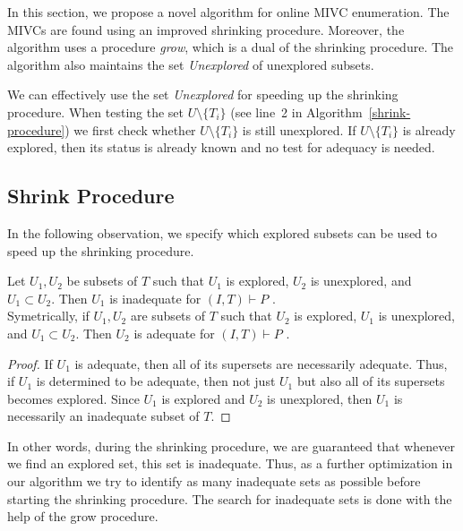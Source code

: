 In this section, we propose a novel algorithm for online MIVC enumeration. The MIVCs are found using an improved shrinking procedure. Moreover, the algorithm uses a procedure \emph{grow}, which is a dual of the shrinking procedure. The algorithm also maintains the set \emph{Unexplored} of unexplored subsets.

We can effectively use the set  \textit{Unexplored} for speeding up the shrinking procedure. When testing the set $U \setminus \{T_i\}$ (see line~2 in Algorithm~\ref{shrink-procedure}) we first check whether  $U \setminus \{T_i\}$ is still unexplored. If $U \setminus \{T_i\}$ is already explored, then its status is already known and no test for adequacy is needed.

\subsection{Shrink Procedure}
\label{sec:shrink}

\iffalse
We can effectively use the set  \textit{Explored} for speeding up the shrinking procedure. When testing the set $U \setminus \{T_i\}$ (see line 2 in Algorithm~\ref{shrink-procedure}) we first check whether  $U \setminus \{T_i\}$ is explored. If so, the status of  $U \setminus \{T_i\}$ is known and no test for adequacy is needed.
\fi

In the following observation, we specify which explored subsets can be used to speed up the shrinking procedure.


\begin{observation}
\label{observation:explored-property}
Let $U_1, U_2$ be subsets of $T$ such that $U_1$ is explored, $U_2$ is unexplored, and $U_1 \subset U_2$. Then $U_1$ is inadequate  for $(I, T) \vdash P$ .\\
Symetrically, if $U_1, U_2$ are subsets of $T$ such that $U_2$ is explored, $U_1$ is unexplored, and $U_1 \subset U_2$. Then $U_2$ is adequate  for $(I, T) \vdash P$ .
\end{observation}

\begin{proof}
If $U_1$ is adequate, then all of its supersets are necessarily adequate. Thus, if $U_1$ is determined to be adequate, then not just $U_1$ but also all of its supersets becomes explored. Since $U_1$ is explored and $U_2$ is unexplored, then $U_1$ is necessarily an inadequate subset of $T$.
\end{proof}

In other words, during the shrinking procedure, we are guaranteed that whenever we find an explored set, this set is inadequate.
Thus, as a further optimization in our algorithm we try to identify as many inadequate sets as possible before starting the shrinking procedure.
The search for inadequate sets is done with the help  of the grow procedure.






